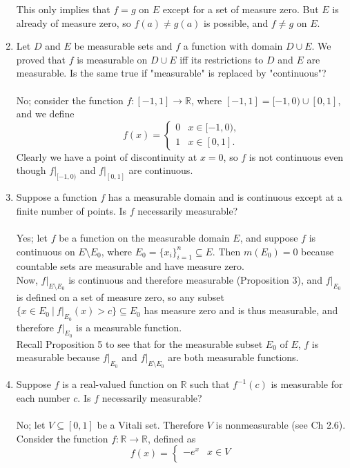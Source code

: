 \begin{enumerate}
    This only implies that $f=g$ on $E$ except for a set of measure zero. But $E$ is already of measure zero, so $f(a)\neq g(a)$ is possible, and $f\neq g$ on $E$.
    \item Let $D$ and $E$ be measurable sets and $f$ a function with domain $D\cup E$. We proved that $f$ is measurable on $D\cup E$ iff its restrictions to $D$ and $E$ are measurable.
    Is the same true if "measurable" is replaced by "continuous"?\\
    \\No; consider the function $f:[-1,1]\to\mathbb{R}$, where $[-1,1]=[-1,0)\cup[0,1]$, and we define
    \[
    f(x)=
    \begin{cases}
        0&x\in[-1,0),\\
        1&x\in[0,1].
    \end{cases}    
    \]
    Clearly we have a point of discontinuity at $x=0$, so $f$ is not continuous even though $f|_{[-1,0)}$ and $f|_{[0,1]}$ are continuous.
    \item Suppose a function $f$ has a measurable domain and is continuous except at a finite number of points.
    Is $f$ necessarily measurable?\\
    \\Yes; let $f$ be a function on the measurable domain $E$, and suppose $f$ is continuous on $E\setminus E_0$, where $E_0=\{x_i\}_{i=1}^n \subseteq E$. Then $m(E_0)=0$ because countable sets are measurable and have measure zero.
    \\Now, $f|_{E\setminus E_0}$ is continuous and therefore measurable (Proposition 3), and $f|_{E_0}$ is defined on a set of measure zero, so any subset $\{x\in E_0\ |\ f|_{E_0}(x)>c\}\subseteq E_0$ has measure zero and is thus measurable, and therefore $f|_{E_0}$ is a measurable function.
    \\Recall Proposition 5 to see that for the measurable subset $E_0$ of $E$, $f$ is measurable because $f|_{E_0}$ and $f|_{E\setminus E_0}$ are both measurable functions.
    \item Suppose $f$ is a real-valued function on $\mathbb{R}$ such that $f^{-1}(c)$ is measurable for each number $c$. Is $f$ necessarily measurable?\\
    \\No; let $V\subseteq[0,1]$ be a Vitali set. Therefore $V$ is nonmeasurable (see Ch 2.6).
    Consider the function $f:\mathbb{R}\to\mathbb{R}$, defined as
    \[
        f(x)=
        \begin{cases}
            -e^x&x\in V\\

\end{cases}\]
\end{enumerate}
